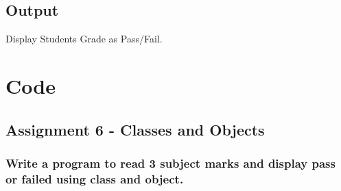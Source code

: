 \documentclass[11pt]{article}
\begin{document}
\subsection{Output}
Display Students Grade as Pass/Fail.


\section{Code}

    
\hypertarget{assignment-6---classes-and-objects}{%
\subsection{Assignment 6 - Classes and
Objects}\label{assignment-6---classes-and-objects}}

    \hypertarget{write-a-program-to-read-3-subject-marks-and-display-pass-or-failed-using-class-and-object.}{%
\subsubsection{Write a program to read 3 subject marks and display pass
or failed using class and
object.}\label{write-a-program-to-read-3-subject-marks-and-display-pass-or-failed-using-class-and-object.}}
\end{document}
